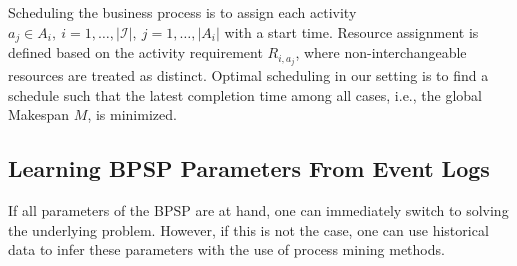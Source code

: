 Scheduling the business process is to assign each activity $a_j \in A_i,\ i=1,\ldots, |\mathcal{I}|,\ j=1,\ldots,|A_i|$ with a start time. Resource assignment is defined based on the activity requirement $R_{i,a_j}$, where non-interchangeable resources are treated as distinct.
Optimal scheduling in our setting is to find a schedule such that the 
latest completion time 
among all cases, i.e., the global Makespan $M$, is minimized. 



\begin{table}[t]
\caption{Example of a simple event log.}
\label{table:real_log_DT}
\end{table}



\subsection{Learning BPSP Parameters From Event Logs} 
If all parameters of the BPSP are at hand, one can immediately switch to solving the underlying problem.
However, if this is not the case, one can use historical data to infer these parameters with the use 
of process mining methods. 

